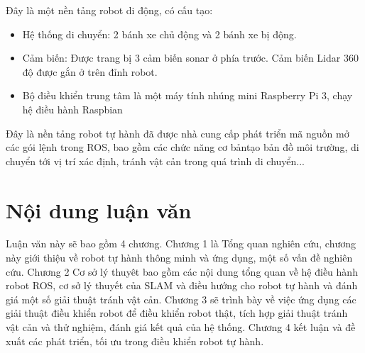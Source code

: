 Đây là một nền tảng robot di động, có cấu tạo:
\begin{itemize}
	\item Hệ thống di chuyển: 2 bánh xe chủ động và 2 bánh xe bị động. 
	\item Cảm biến: Được trang bị 3 cảm biến sonar ở phía trước. Cảm biến Lidar 360 độ được gắn ở trên đỉnh robot.
	\item Bộ điều khiển trung tâm là một máy tính nhúng mini Raspberry Pi 3, chạy hệ điều hành Raspbian	
\end{itemize}

Đây là nền tảng robot tự hành đã được nhà cung cấp phát triển mã nguồn mở các gói lệnh trong ROS, bao gồm các chức năng cơ bảntạo bản đồ môi trường, di chuyển tới vị trí xác định, tránh vật cản trong quá trình di chuyển...

\section{Nội dung luận văn} 
Luận văn này sẽ bao gồm 4 chương. Chương 1 là Tổng quan nghiên cứu, chương này giới thiệu về robot tự hành thông minh và ứng dụng, một số vấn đề nghiên cứu. Chương 2 Cơ sở lý thuyêt bao gồm các nội dung tổng quan về hệ điều hành robot ROS, cơ sở lý thuyết của SLAM và điều hướng cho robot tự hành và đánh giá một số giải thuật tránh vật cản. Chương 3 sẽ trình bày về việc ứng dụng các giải thuật điều khiển robot để điều khiển robot thật, tích hợp giải thuật tránh vật cản và thử nghiệm, đánh giá kết quả của hệ thống. Chương 4 kết luận và đề xuất các phát triển, tối ưu trong điều khiển robot tự hành. 


